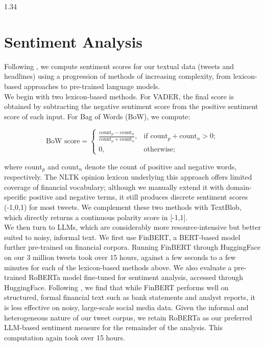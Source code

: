 \documentclass{article}
\begin{document}
\begin{setstretch}{1.34}
\section{Sentiment Analysis}

Following \textcite{shao2025revisiting}, we compute sentiment scores for our textual data (tweets and headlines) using a progression of methods of increasing complexity, from lexicon-based approaches to pre-trained language models. \\

We begin with two lexicon-based methods. For VADER, the final score is obtained by subtracting the negative sentiment score from the positive sentiment score of each input. For Bag of Words (BoW), we compute:

 $$\text{BoW score}=
\begin{cases}
\frac{\text{count}_p-\text{count}_n}{\text{count}_p+\text{count}_n}, & \text{if count}_p + \text{count}_n > 0 ;\\
0, & \text{otherwise} ;
\end{cases}
$$

where $\text{count}_p$ and $\text{count}_n$ denote the count of positive and negative words, respectively. The NLTK opinion lexicon underlying this approach offers limited coverage of financial vocabulary; although we manually extend it with domain-specific positive and negative terms, it still produces discrete sentiment scores (-1,0,1) for most tweets. We complement these two methods with TextBlob, which directly returns a continuous polarity score in [-1,1]. \\

We then turn to LLMs, which are considerably more resource-intensive but better suited to noisy, informal text. We first use FinBERT, a BERT-based model further pre-trained on financial corpora. Running FinBERT through HuggingFace on our 3 million tweets took over 15 hours, against a few seconds to a few minutes for each of the lexicon-based methods above. We also evaluate a pre-trained RoBERTa model fine-tuned for sentiment analysis, accessed through HuggingFace. Following \textcite{shao2025revisiting}, we find that while FinBERT performs well on structured, formal financial text such as bank statements and analyst reports, it is less effective on noisy, large-scale social media data. Given the informal and heterogeneous nature of our tweet corpus, we retain RoBERTa as our preferred LLM-based sentiment measure for the remainder of the analysis. This computation again took over 15 hours. \\


\end{setstretch}
\end{document}
